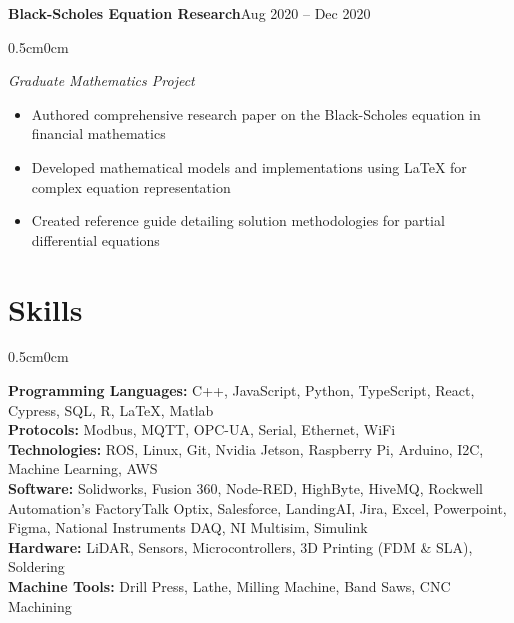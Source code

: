 \documentclass[10pt]{article}
\newenvironment{onecolentry}{
    \begin{adjustwidth}{0.5cm}{0cm}
}{
    \end{adjustwidth}
}
\newenvironment{highlights}{
    \begin{itemize}[
        leftmargin=0.5cm,
        rightmargin=0cm,
        itemindent=0cm,
        labelwidth=0.3cm,
        labelsep=0.2cm,
        align=left,
        itemsep=0.05cm,
        topsep=0.05cm,
        parsep=0.05cm,
        partopsep=0pt
    ]
}{
    \end{itemize}
    \vspace{0.1cm}
}
\begin{document}
    \begin{twocolentry}{\textbf{Black-Scholes Equation Research}}{Aug 2020 -- Dec 2020}
    \end{twocolentry}
    \begin{onecolentry}
    \textit{Graduate Mathematics Project}
    \begin{highlights}
        \item Authored comprehensive research paper on the Black-Scholes equation in financial mathematics
        \item Developed mathematical models and implementations using LaTeX for complex equation representation
        \item Created reference guide detailing solution methodologies for partial differential equations
    \end{highlights}
    \end{onecolentry}

    \section{Skills}
    \begin{onecolentry}
        \textbf{Programming Languages:} C++, JavaScript, Python, TypeScript, React, Cypress, SQL, R, LaTeX, Matlab \\
        \textbf{Protocols:} Modbus, MQTT, OPC-UA, Serial, Ethernet, WiFi \\
        \textbf{Technologies:} ROS, Linux, Git, Nvidia Jetson, Raspberry Pi, Arduino, I2C, Machine Learning, AWS \\
        \textbf{Software:} Solidworks, Fusion 360, Node-RED, HighByte, HiveMQ, Rockwell Automation's FactoryTalk Optix, Salesforce, LandingAI, Jira, Excel, Powerpoint, Figma, National Instruments DAQ, NI Multisim, Simulink \\
        \textbf{Hardware:} LiDAR, Sensors, Microcontrollers, 3D Printing (FDM \& SLA), Soldering \\
        \textbf{Machine Tools:} Drill Press, Lathe, Milling Machine, Band Saws, CNC Machining
    \end{onecolentry}
\end{document}
